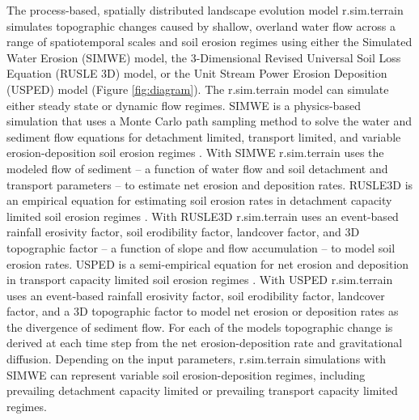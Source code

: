 \documentclass[gmd, manuscript]{copernicus}
\begin{document}
The process-based, spatially distributed 
landscape evolution model r.sim.terrain
simulates topographic changes
caused by shallow, overland water flow
across a range of spatiotemporal scales and soil erosion regimes
using either
the Simulated Water Erosion (SIMWE) model, 
the 3-Dimensional Revised Universal Soil Loss Equation (RUSLE 3D) model,
or the Unit Stream Power Erosion Deposition (USPED) model (Figure \ref {fig:diagram}).  
The r.sim.terrain model
can simulate either steady state or dynamic flow regimes.
SIMWE is a physics-based simulation
that uses a Monte Carlo path sampling method
to solve the water and sediment flow equations
for detachment limited, transport limited, and variable erosion-deposition 
soil erosion regimes 
\citep{Mitas1998,Mitasova2004}. 
With SIMWE 
r.sim.terrain
uses the modeled flow of sediment 
-- a function of water flow and soil detachment and transport parameters -- 
to estimate net erosion and deposition rates. 
RUSLE3D is an empirical equation for estimating soil erosion rates
in detachment capacity limited soil erosion regimes 
\citep{Mitasova1996,Mitasova2013}. 
%
With RUSLE3D r.sim.terrain
uses an event-based rainfall erosivity factor, 
soil erodibility factor, landcover factor, and 3D topographic factor
-- a function of slope and flow accumulation --
to model soil erosion rates. 
USPED is a semi-empirical equation for net erosion and deposition 
in transport capacity limited soil erosion regimes 
\citep{Mitasova1996,Mitasova2013}. 
With USPED r.sim.terrain uses an event-based rainfall erosivity factor, 
soil erodibility factor, landcover factor, and a 3D topographic factor
to model net erosion or deposition rates as the divergence of sediment flow. 
For each of the models 
topographic change is derived at each time step
from the net erosion-deposition rate
and gravitational diffusion.
Depending on the input parameters, 
r.sim.terrain simulations with SIMWE 
can represent variable soil erosion-deposition regimes, 
including prevailing detachment capacity limited 
or prevailing transport capacity limited regimes.
\end{document}
